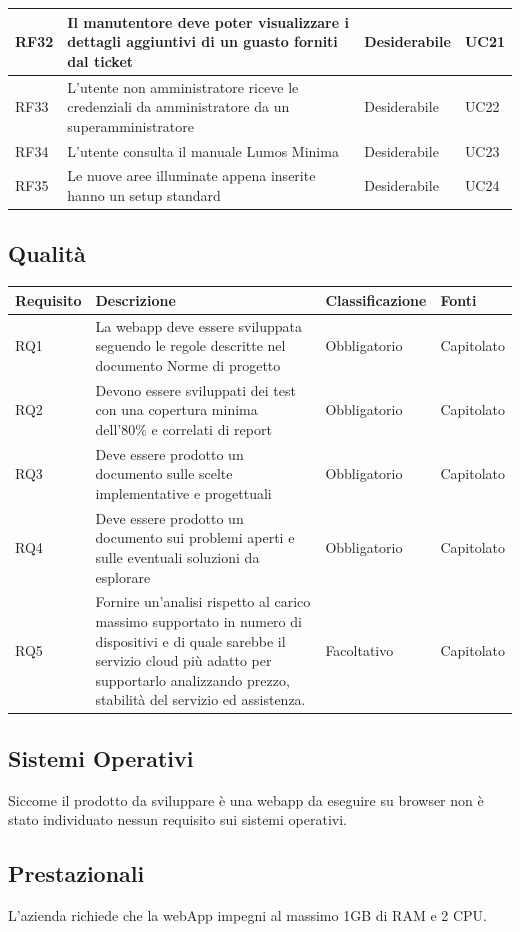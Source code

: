 \documentclass[12pt]{article}
\begin{document}
\begin{xltabular}{\linewidth}{|>{\hsize}X|>{\hsize}X|>{\hsize}X|>{\hsize}X|}
\hline				
RF32	 & Il manutentore deve poter visualizzare i dettagli aggiuntivi di un guasto forniti dal ticket & Desiderabile & UC21 \\
\hline				
RF33	 & L'utente non amministratore riceve le credenziali da amministratore da un superamministratore & Desiderabile & UC22 \\
\hline				
RF34	 & L'utente consulta il manuale Lumos Minima & Desiderabile & UC23 \\
\hline				
RF35	 & Le nuove aree illuminate appena inserite hanno un setup standard & Desiderabile & UC24 \\
\hline				
\end{xltabular}


\subsection{Qualità}
\begin{tabular}{ |p{1.8cm}|p{5.2cm}|p{3cm}| p{2cm}| }
\hline
Requisito& Descrizione &Classificazione &Fonti \\
\hline
RQ1 & La webapp deve essere sviluppata seguendo le regole descritte nel documento Norme di progetto & Obbligatorio & Capitolato \\
RQ2 & Devono essere sviluppati dei test con una copertura minima dell'80\% e correlati di report & Obbligatorio & Capitolato\\
RQ3 & Deve essere prodotto un documento sulle scelte implementative e progettuali & Obbligatorio & Capitolato \\
RQ4 & Deve essere prodotto un documento sui problemi aperti e sulle eventuali soluzioni da esplorare & Obbligatorio & Capitolato \\
RQ5 & Fornire un’analisi rispetto al carico massimo supportato in numero di dispositivi e di quale sarebbe il servizio cloud più adatto per supportarlo analizzando prezzo, stabilità del servizio ed assistenza.  &  Facoltativo & Capitolato \\
\hline

\end{tabular}
\subsection{Sistemi Operativi}
Siccome il prodotto da sviluppare è una webapp da eseguire su browser non è stato individuato nessun requisito sui sistemi operativi.
\subsection{Prestazionali}
L'azienda richiede che la webApp impegni al massimo 1GB di RAM e 2 CPU.
\end{document}
